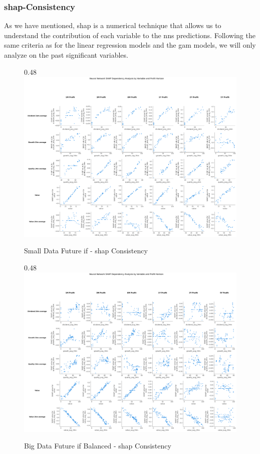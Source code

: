 \documentclass[11pt,english,a4paper,hidelinks]{book}
\begin{document}
\subsubsection{\acrshort{shap}-Consistency}

\noindent As we have mentioned, \gls{shap} is a numerical technique that allows us to understand the contribution of each variable to the \acrshort{nn}s predictions. Following the same criteria as for the linear regression models and the \acrshort{gam} models, we will only analyze on the past significant variables.


\begin{figure}{0.48\textwidth}
    \centering
    \includegraphics[width=\textwidth]{images/code/models/neural_network/binary_classifier_nn/Small Test - IF/shap_table_analysis.png}
    \caption{Small Data Future \acrshort{if} - \gls{shap} Consistency}
    \label{fig:small_binary_shap_consistency}
\end{figure}

\begin{figure}{0.48\textwidth}
    \centering
    \includegraphics[width=\textwidth]{images/code/models/neural_network/binary_classifier_nn/Big Data future - IF HARD Balanced/shap_table_analysis.png}
    \caption{Big Data Future \acrshort{if} Balanced - \gls{shap} Consistency}
    \label{fig:big_binary_shap_consistency}
\end{figure}
\end{document}
